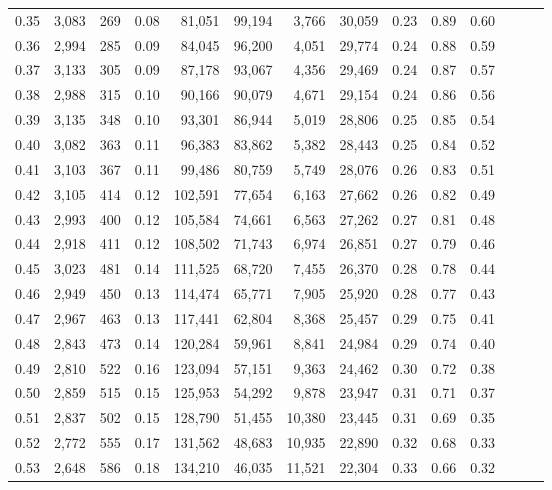 \begin{tabular}{rrrrrrrrrrrrrr}
0.35 &  3,083 &  269 &  0.08 &   81,051 &   99,194 &   3,766 &  30,059 &  0.23 &  0.89 &      0.60 \\
0.36 &  2,994 &  285 &  0.09 &   84,045 &   96,200 &   4,051 &  29,774 &  0.24 &  0.88 &      0.59 \\
0.37 &  3,133 &  305 &  0.09 &   87,178 &   93,067 &   4,356 &  29,469 &  0.24 &  0.87 &      0.57 \\
0.38 &  2,988 &  315 &  0.10 &   90,166 &   90,079 &   4,671 &  29,154 &  0.24 &  0.86 &      0.56 \\
0.39 &  3,135 &  348 &  0.10 &   93,301 &   86,944 &   5,019 &  28,806 &  0.25 &  0.85 &      0.54 \\
0.40 &  3,082 &  363 &  0.11 &   96,383 &   83,862 &   5,382 &  28,443 &  0.25 &  0.84 &      0.52 \\
0.41 &  3,103 &  367 &  0.11 &   99,486 &   80,759 &   5,749 &  28,076 &  0.26 &  0.83 &      0.51 \\
0.42 &  3,105 &  414 &  0.12 &  102,591 &   77,654 &   6,163 &  27,662 &  0.26 &  0.82 &      0.49 \\
0.43 &  2,993 &  400 &  0.12 &  105,584 &   74,661 &   6,563 &  27,262 &  0.27 &  0.81 &      0.48 \\
0.44 &  2,918 &  411 &  0.12 &  108,502 &   71,743 &   6,974 &  26,851 &  0.27 &  0.79 &      0.46 \\
0.45 &  3,023 &  481 &  0.14 &  111,525 &   68,720 &   7,455 &  26,370 &  0.28 &  0.78 &      0.44 \\
0.46 &  2,949 &  450 &  0.13 &  114,474 &   65,771 &   7,905 &  25,920 &  0.28 &  0.77 &      0.43 \\
0.47 &  2,967 &  463 &  0.13 &  117,441 &   62,804 &   8,368 &  25,457 &  0.29 &  0.75 &      0.41 \\
0.48 &  2,843 &  473 &  0.14 &  120,284 &   59,961 &   8,841 &  24,984 &  0.29 &  0.74 &      0.40 \\
0.49 &  2,810 &  522 &  0.16 &  123,094 &   57,151 &   9,363 &  24,462 &  0.30 &  0.72 &      0.38 \\
0.50 &  2,859 &  515 &  0.15 &  125,953 &   54,292 &   9,878 &  23,947 &  0.31 &  0.71 &      0.37 \\
0.51 &  2,837 &  502 &  0.15 &  128,790 &   51,455 &  10,380 &  23,445 &  0.31 &  0.69 &      0.35 \\
0.52 &  2,772 &  555 &  0.17 &  131,562 &   48,683 &  10,935 &  22,890 &  0.32 &  0.68 &      0.33 \\
0.53 &  2,648 &  586 &  0.18 &  134,210 &   46,035 &  11,521 &  22,304 &  0.33 &  0.66 &      0.32 \\

\end{tabular}
